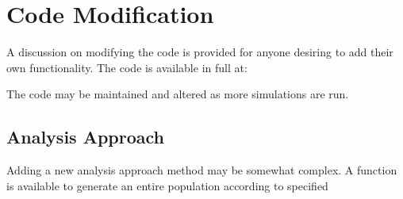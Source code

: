 \chapter{Code Modification}
\label{app:CM}

A discussion on modifying the code is provided for anyone desiring to add their own functionality. The code is available in full at:

The code may be maintained and altered as more simulations are run.

\section{Analysis Approach}

Adding a new analysis approach method may be somewhat complex. A function is available to generate an entire population according to specified 
\endinput
